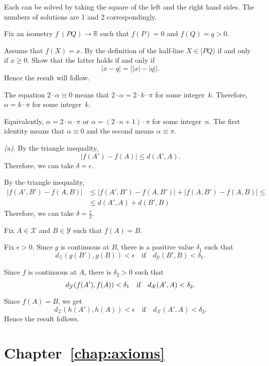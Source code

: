 Each can be solved by taking the square of the left and the right hand sides.
The numbers of solutions are 1 and 2 correspondingly.

Fix an isometry $f\:(P Q)\to \mathbb{R}$ such that $f(P)=0$ and $f(Q)=q>0$.

Assume that $f(X)=x$.
By the definition of the half-line $X\in[PQ)$ if and only if $x\ge 0$.
Show that the latter holds if and only if 
\[|x-q|=\bigl||x|-|q|\bigr|.\]
Hence the result will follow.


The equation
$2\cdot\alpha\equiv 0$
means that $2\cdot\alpha=2\cdot k\cdot\pi$ for some integer~$k$.
Therefore,
$\alpha=k\cdot\pi$ for some integer~$k$.

Equivalently, $\alpha=2\cdot n\cdot \pi$ or $\alpha=(2\cdot n+1)\cdot \pi$ for some integer~$n$.
The first identity means that $\alpha\equiv 0$ and the second means $\alpha\equiv \pi$.

 \textit{(a).}
By the triangle inequality,
$$|f(A')-f(A)|\le d(A',A).$$
Therefore, we can take $\delta=\epsilon$.

By the triangle inequality,
\begin{align*}
|f(A',B')-f(A,B)|
&\le |f(A',B')-f(A,B')|
+|f(A,B')-f(A,B)|
\le
\\
&\le d(A',A)+d(B',B)
\end{align*}
Therefore, we can take $\delta=\tfrac\epsilon2$.

Fix $A\in \mathcal{X}$ and $B\in\mathcal{Y}$
such that $f(A)=B$.

Fix $\epsilon>0$.
Since $g$ is continuous at $B$, there is a positive value $\delta_1$ such that 
$$d_{\mathcal{Z}}(g(B'),g(B))<\epsilon
\quad
\text{if}
\quad
d_{\mathcal{Y}}(B',B)<\delta_1.$$ 

Since $f$ is continuous at $A$, there is $\delta_2>0$ such that 
$$d_{\mathcal{Y}}(f(A'),f(A))\z<\delta_1
\quad
\text{if}
\quad
d_{\mathcal{X}}(A',A)<\delta_2.$$ 

Since $f(A)=B$, we get
$$d_{\mathcal{Z}}(h(A'),h(A))<\epsilon
\quad
\text{if}
\quad
d_{\mathcal{X}}(A',A)<\delta_2.$$ 
Hence the result follows.


\section*{Chapter~\ref{chap:axioms}}
\setcounter{eqtn}{0}

